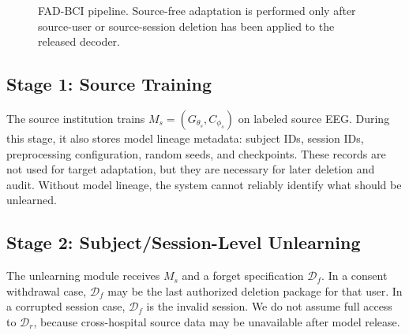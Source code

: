 \documentclass[10pt,twocolumn]{article}
\begin{document}
\begin{figure}[t]
\centering
{}
\caption{FAD-BCI pipeline. Source-free adaptation is performed only after source-user or source-session deletion has been applied to the released decoder.}
\label{fig:pipeline}
\end{figure}

\subsection{Stage 1: Source Training}
The source institution trains $M_s=(G_{\theta_s},C_{\phi_s})$ on labeled source EEG. During this stage, it also stores model lineage metadata: subject IDs, session IDs, preprocessing configuration, random seeds, and checkpoints. These records are not used for target adaptation, but they are necessary for later deletion and audit. Without model lineage, the system cannot reliably identify what should be unlearned.

\subsection{Stage 2: Subject/Session-Level Unlearning}
The unlearning module receives $M_s$ and a forget specification $\mathcal{D}_f$. In a consent withdrawal case, $\mathcal{D}_f$ may be the last authorized deletion package for that user. In a corrupted session case, $\mathcal{D}_f$ is the invalid session. We do not assume full access to $\mathcal{D}_r$, because cross-hospital source data may be unavailable after model release.
\end{document}
